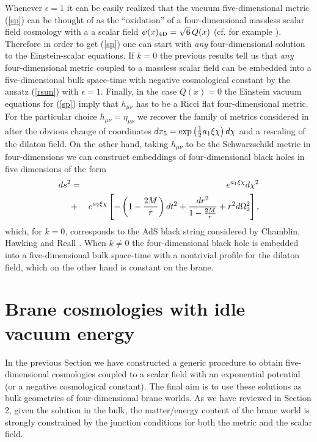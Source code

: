 \documentclass[prd,a4paper,twocolumn,superscriptaddress,nofootinbib,showpacs]{revtex4}
\begin{document}
Whenever $\epsilon=1$ it can be easily realized that the vacuum five-dimensional metric (\ref{sp})
 can be thought of as the 
``oxidation'' of a four-dimensional massless scalar field cosmology with a a scalar field 
$\psi(x)_{\rm 4D}=
\sqrt{6}\,Q(x)$ (cf. for example \cite{fvm}). Therefore in order to get (\ref{sp}) one can start
with {\it any} four-dimensional solution to the Einstein-scalar equations. 
If $k=0$ the previous results tell us that {\it any} four-dimensional metric coupled
to a massless scalar field can be embedded into a five-dimensional bulk space-time with negative cosmological
constant by the ansatz (\ref{rsun}) with $\epsilon=1$.
Finally, in the case $Q(x)=0$ the Einstein vacuum equations for (\ref{sp}) imply that $h_{\mu\nu}$ has 
to be a Ricci flat four-dimensional metric. For the particular choice 
$h_{\mu\nu}=\eta_{\mu\nu}$ we recover the family of metrics considered in \cite{kach} 
after the obvious change of coordinates $dx_{5}=\exp\left({1\over 2}a_{1}\xi\chi\right)d\chi$ and
a rescaling of the dilaton field. On the other hand, taking $h_{\mu\nu}$ to be the Schwarzschild
metric in four-dimensions we can construct embeddings of four-dimensional black holes in five dimensions of 
the form
\begin{eqnarray}
ds^2&=&e^{a_{1}\xi \chi}d\chi^2 \nonumber \\
&+&e^{a_{2}\xi\chi}\left[-\left(1-{2M\over r}\right)dt^2
+{dr^2\over 1-{2M\over r}}+r^2 d\Omega_{2}^2\right], \nonumber 
\end{eqnarray}
which, for $k=0$, corresponds to the AdS black string considered by Chamblin, Hawking and Reall \cite{rh}.
When $k\neq 0$ the four-dimensional black hole is embedded into a five-dimensional bulk space-time with
a nontrivial profile for the dilaton field, which on the other hand is constant on the brane. 


\section{Brane cosmologies with idle vacuum energy}


In the previous Section we have constructed a generic procedure to obtain five-dimensional
cosmologies coupled to a scalar field with an exponential potential (or a negative cosmological
constant). The final aim is to use these solutions as bulk geometries of four-dimensional brane worlds.
As we have reviewed in Section 2, given the solution in the bulk, the matter/energy content of the brane world
is strongly constrained by the junction conditions for both the metric and the scalar field. 
\end{document}
